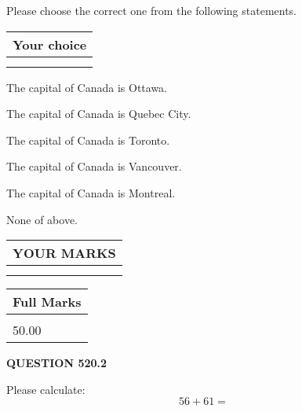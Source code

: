 \documentclass[12pt]{article}
\begin{document}
  
Please choose the correct one from the following statements.
  
  
\noindent\hspace{3.0in} \begin{tabular}{|l|}
\hline
Your choice \\
\hline
 \\ 
 \\ 
\hline
\end{tabular}
  
  
 
 
The capital of Canada is Ottawa.
 
 
The capital of Canada is Quebec City.
 
 
The capital of Canada is Toronto.
 
 
The capital of Canada is Vancouver.
 
 
The capital of Canada is Montreal.
 
 
 None of above.
 
 
  
\vspace{0.2in}
  
\noindent\begin{tabular}{|l|}
\hline
 YOUR MARKS  \\
\hline
 \\ 
 \\ 
\hline
\end{tabular}
\hspace{0.05in} \begin{tabular}{|l|}
\hline
 Full Marks  \\
\hline
 \\ 
50.00 \\
\hline
\end{tabular}
{\textbf{\Large{QUESTION
520.2 
}}}
  
  
 
Please calculate:
\begin{equation}
56 +  %
61 = \nonumber
\end{equation}
 

 

 
   
   
 \vspace{0.2in}
 
   
   
   
   
\end{document}
